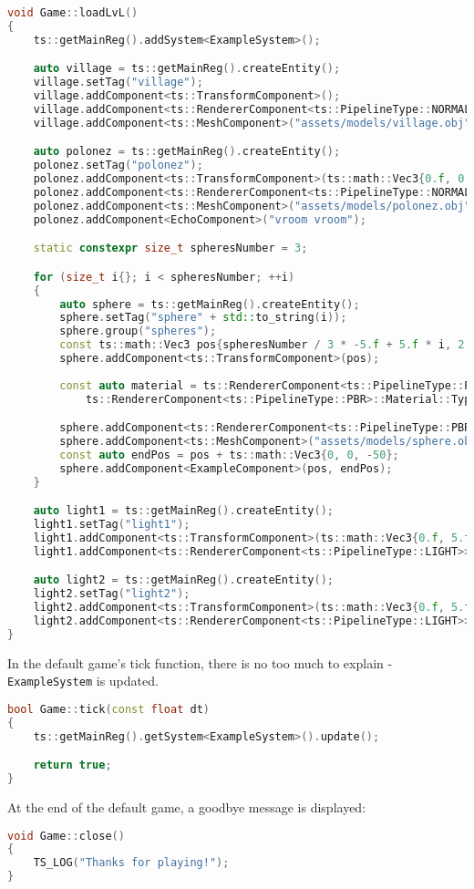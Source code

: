 \begin{lstlisting}[language=c++, caption=An example of a game load level function (./game/game.cpp)]
void Game::loadLvL()
{
    ts::getMainReg().addSystem<ExampleSystem>();

    auto village = ts::getMainReg().createEntity();
    village.setTag("village");
    village.addComponent<ts::TransformComponent>();
    village.addComponent<ts::RendererComponent<ts::PipelineType::NORMAL_LIGHTING>>();
    village.addComponent<ts::MeshComponent>("assets/models/village.obj");

    auto polonez = ts::getMainReg().createEntity();
    polonez.setTag("polonez");
    polonez.addComponent<ts::TransformComponent>(ts::math::Vec3{0.f, 0.f, -10.f});
    polonez.addComponent<ts::RendererComponent<ts::PipelineType::NORMAL_LIGHTING>>();
    polonez.addComponent<ts::MeshComponent>("assets/models/polonez.obj");
    polonez.addComponent<EchoComponent>("vroom vroom");

    static constexpr size_t spheresNumber = 3;

    for (size_t i{}; i < spheresNumber; ++i)
    {
        auto sphere = ts::getMainReg().createEntity();
        sphere.setTag("sphere" + std::to_string(i));
        sphere.group("spheres");
        const ts::math::Vec3 pos{spheresNumber / 3 * -5.f + 5.f * i, 2.f, -5.f};
        sphere.addComponent<ts::TransformComponent>(pos);
     
        const auto material = ts::RendererComponent<ts::PipelineType::PBR>::Material::create(
            ts::RendererComponent<ts::PipelineType::PBR>::Material::Type::GOLD);

        sphere.addComponent<ts::RendererComponent<ts::PipelineType::PBR>>(material);
        sphere.addComponent<ts::MeshComponent>("assets/models/sphere.obj");
        const auto endPos = pos + ts::math::Vec3{0, 0, -50};
        sphere.addComponent<ExampleComponent>(pos, endPos);
    }

    auto light1 = ts::getMainReg().createEntity();
    light1.setTag("light1");
    light1.addComponent<ts::TransformComponent>(ts::math::Vec3{0.f, 5.f, -7.f});
    light1.addComponent<ts::RendererComponent<ts::PipelineType::LIGHT>>();

    auto light2 = ts::getMainReg().createEntity();
    light2.setTag("light2");
    light2.addComponent<ts::TransformComponent>(ts::math::Vec3{0.f, 5.f,  0.f});
    light2.addComponent<ts::RendererComponent<ts::PipelineType::LIGHT>>();
}
\end{lstlisting}
In the default game's tick function, there is no too much to explain - \texttt{ExampleSystem} is updated.
\begin{lstlisting}[language=c++, caption=An example of a game \texttt{tick} function (./game/game.cpp)]
bool Game::tick(const float dt)
{
    ts::getMainReg().getSystem<ExampleSystem>().update();

    return true;
}
\end{lstlisting}
At the end of the default game, a goodbye message is displayed:
\begin{lstlisting}[language=c++, caption=An example of a game \texttt{close} function (./game/game.cpp)]
void Game::close()
{
    TS_LOG("Thanks for playing!");
}
\end{lstlisting}